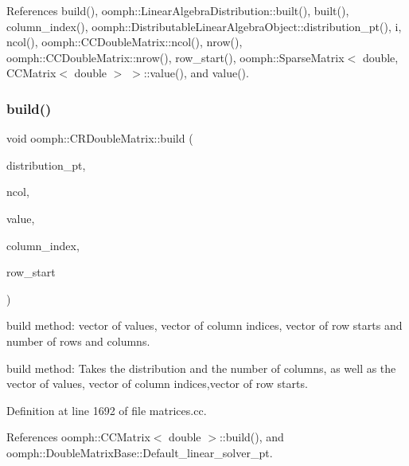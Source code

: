 References build(), oomph\+::\+Linear\+Algebra\+Distribution\+::built(), built(), column\+\_\+index(), oomph\+::\+Distributable\+Linear\+Algebra\+Object\+::distribution\+\_\+pt(), i, ncol(), oomph\+::\+C\+C\+Double\+Matrix\+::ncol(), nrow(), oomph\+::\+C\+C\+Double\+Matrix\+::nrow(), row\+\_\+start(), oomph\+::\+Sparse\+Matrix$<$ double, C\+C\+Matrix$<$ double $>$ $>$\+::value(), and value().

\mbox{\label{classoomph_1_1CRDoubleMatrix_af44bac2acd071317f96dae49cbb0d977}} 
\subsubsection{\texorpdfstring{build()}{build()}\hspace{0.1cm}{\footnotesize\ttfamily [1/3]}}
{\footnotesize\ttfamily void oomph\+::\+C\+R\+Double\+Matrix\+::build (\begin{DoxyParamCaption}\item[{const \hyperlink{classoomph_1_1LinearAlgebraDistribution}{Linear\+Algebra\+Distribution} $\ast$}]{distribution\+\_\+pt,  }\item[{const unsigned \&}]{ncol,  }\item[{const \hyperlink{classoomph_1_1Vector}{Vector}$<$ double $>$ \&}]{value,  }\item[{const \hyperlink{classoomph_1_1Vector}{Vector}$<$ int $>$ \&}]{column\+\_\+index,  }\item[{const \hyperlink{classoomph_1_1Vector}{Vector}$<$ int $>$ \&}]{row\+\_\+start }\end{DoxyParamCaption})}



build method\+: vector of values, vector of column indices, vector of row starts and number of rows and columns. 

build method\+: Takes the distribution and the number of columns, as well as the vector of values, vector of column indices,vector of row starts. 

Definition at line 1692 of file matrices.\+cc.



References oomph\+::\+C\+C\+Matrix$<$ double $>$\+::build(), and oomph\+::\+Double\+Matrix\+Base\+::\+Default\+\_\+linear\+\_\+solver\+\_\+pt.



